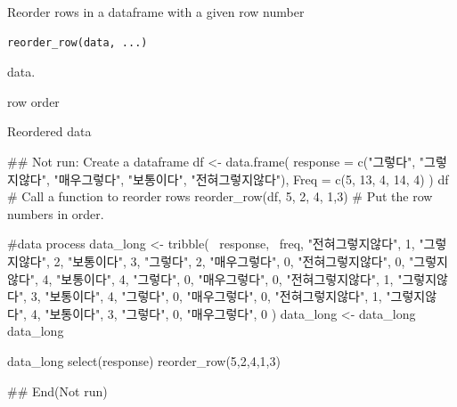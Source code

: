 \documentclass[a4paper]{book}
\begin{document}
%
\begin{Description}
Reorder rows in a dataframe with a given row number
\end{Description}
%
\begin{Usage}
\begin{verbatim}
reorder_row(data, ...)
\end{verbatim}
\end{Usage}
%
\begin{Arguments}
\begin{ldescription}
\item[\code{data}] data.

\item[\code{...}] row order
\end{ldescription}
\end{Arguments}
%
\begin{Value}
Reordered data
\end{Value}
%
\begin{Examples}
\begin{ExampleCode}
\#\# Not run: 
Create a dataframe
df <- data.frame(
  response = c("그렇다", "그렇지않다", "매우그렇다", "보통이다", "전혀그렇지않다"),
  Freq = c(5, 13, 4, 14, 4)
)
df
# Call a function to reorder rows
reorder_row(df, 5, 2, 4, 1,3)  # Put the row numbers in order.

#data process
data_long <- tribble(
  ~response, ~freq,
  "전혀그렇지않다", 1,
  "그렇지않다", 2,
  "보통이다", 3,
  "그렇다", 2,
  "매우그렇다", 0,
  "전혀그렇지않다", 0,
  "그렇지않다", 4,
  "보통이다", 4,
  "그렇다", 0,
  "매우그렇다", 0,
  "전혀그렇지않다", 1,
  "그렇지않다", 3,
  "보통이다", 4,
  "그렇다", 0,
  "매우그렇다", 0,
  "전혀그렇지않다", 1,
  "그렇지않다", 4,
  "보통이다", 3,
  "그렇다", 0,
  "매우그렇다", 0
)
data_long <- data_long %
data_long

data_long %
  select(response)%
  reorder_row(5,2,4,1,3)


## End(Not run)

\end{ExampleCode}
\end{Examples}
\end{document}
